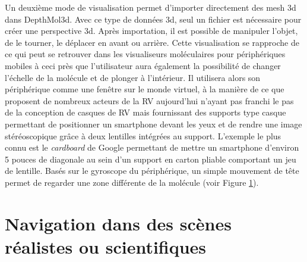 Un deuxième mode de visualisation permet d'importer directement des mesh 3d dans DepthMol3d. Avec ce type de données 3d, seul un fichier est nécessaire pour créer une perspective 3d. Après importation, il est possible de manipuler l'objet, de le tourner, le déplacer en avant ou arrière. Cette visualisation se rapproche de ce qui peut se retrouver dans les visualiseurs moléculaires pour périphériques mobiles à ceci près que l'utilisateur aura également la possibilité de changer l'échelle de la molécule et de plonger à l'intérieur. Il utilisera alors son périphérique comme une fenêtre sur le monde virtuel, à la manière de ce que proposent de nombreux acteurs de la RV aujourd'hui n'ayant pas franchi le pas de la conception de casques de RV mais fournissant des supports type casque permettant de positionner un smartphone devant les yeux et de rendre une image stéréoscopique grâce à deux lentilles intégrées au support. L'exemple le plus connu est le \textit{cardboard} de Google permettant de mettre un smartphone d'environ 5 pouces de diagonale au sein d'un support en carton pliable comportant un jeu de lentille. Basés sur le gyroscope du périphérique, un simple mouvement de tête permet de regarder une zone différente de la molécule (voir Figure \ref{}).




\section{Navigation dans des scènes réalistes ou scientifiques}


